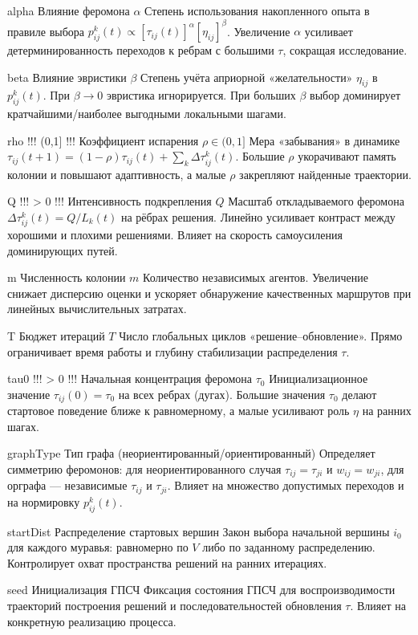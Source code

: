 alpha
Влияние феромона $\alpha$
Степень использования накопленного опыта в правиле выбора $p_{ij}^k(t)\propto [\tau_{ij}(t)]^{\alpha}[\eta_{ij}]^{\beta}$. Увеличение $\alpha$ усиливает детерминированность переходов к ребрам с большими $\tau$, сокращая исследование.

beta
Влияние эвристики $\beta$
Степень учёта априорной «желательности» $\eta_{ij}$ в $p_{ij}^k(t)$. При $\beta\to 0$ эвристика игнорируется. При больших $\beta$ выбор доминирует кратчайшими/наиболее выгодными локальными шагами.

rho !!! \in (0,1] !!!
Коэффициент испарения $\rho\in(0,1]$
Мера «забывания» в динамике $\tau_{ij}(t+1)=(1-\rho)\tau_{ij}(t)+\sum_k\Delta\tau_{ij}^k(t)$. Большие $\rho$ укорачивают память колонии и повышают адаптивность, а малые $\rho$ закрепляют найденные траектории.

Q !!! > 0 !!!
Интенсивность подкрепления $Q$
Масштаб откладываемого феромона $\Delta\tau_{ij}^k(t)=Q/L_k(t)$ на рёбрах решения. Линейно усиливает контраст между хорошими и плохими решениями. Влияет на скорость самоусиления доминирующих путей.

m
Численность колонии $m$
Количество независимых агентов. Увеличение снижает дисперсию оценки и ускоряет обнаружение качественных маршрутов при линейных вычислительных затратах.

T
Бюджет итераций $T$
Число глобальных циклов «решение–обновление». Прямо ограничивает время работы и глубину стабилизации распределения $\tau$.

tau0 !!! > 0 !!!
Начальная концентрация феромона $\tau_0$
Инициализационное значение $\tau_{ij}(0)=\tau_0$ на всех ребрах (дугах). Большие значения $\tau_0$ делают стартовое поведение ближе к равномерному, а малые усиливают роль $\eta$ на ранних шагах.

graphType
Тип графа (неориентированный/ориентированный)
Определяет симметрию феромонов: для неориентированного случая $\tau_{ij}=\tau_{ji}$ и $w_{ij}=w_{ji}$, для орграфа — независимые $\tau_{ij}$ и $\tau_{ji}$. Влияет на множество допустимых переходов и на нормировку $p_{ij}^k(t)$.

startDist
Распределение стартовых вершин
Закон выбора начальной вершины $i_0$ для каждого муравья: равномерно по $V$ либо по заданному распределению. Контролирует охват пространства решений на ранних итерациях.

seed
Инициализация ГПСЧ
Фиксация состояния ГПСЧ для воспроизводимости траекторий построения решений и последовательностей обновления $\tau$. Влияет на конкретную реализацию процесса.
